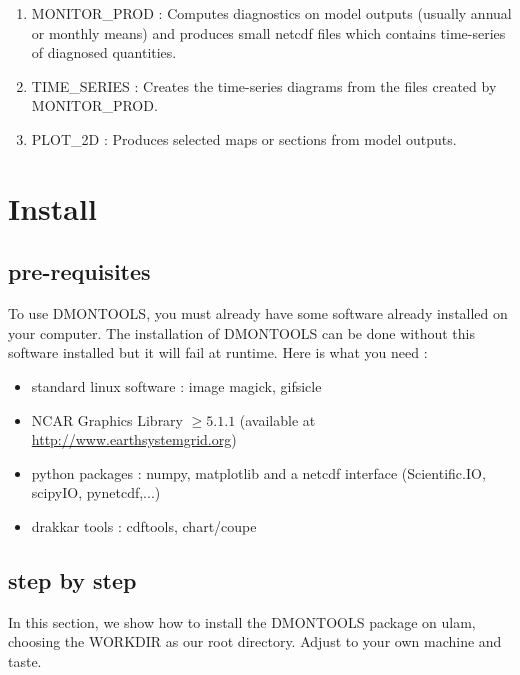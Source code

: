 \documentclass[a4paper,11pt]{article}
\begin{document}
\begin{enumerate}
\item MONITOR\_PROD : Computes diagnostics on model outputs (usually annual or monthly means) and produces small netcdf
files which contains time-series of diagnosed quantities.
\item TIME\_SERIES : Creates the time-series diagrams  from the files created by MONITOR\_PROD.
\item PLOT\_2D : Produces selected maps or sections from model outputs. 
\end{enumerate}

\clearpage
\newpage

\section{Install}

\subsection{pre-requisites}

To use DMONTOOLS, you must already have some software already installed on your computer. The installation
of DMONTOOLS can be done without this software installed but it will fail at runtime. Here is what you need :

\begin{itemize}
\item standard linux software : image magick, gifsicle
\item NCAR Graphics Library $ \geq 5.1.1$ (available at \url{http://www.earthsystemgrid.org})
\item python packages : numpy, matplotlib and a netcdf interface (Scientific.IO, scipyIO, pynetcdf,...)
\item drakkar tools : cdftools, chart/coupe 
\end{itemize}

\subsection{step by step}

\noindent
In this section, we show how to install the DMONTOOLS package on ulam, choosing the WORKDIR as our root
directory. Adjust to your own machine and taste.
\end{document}
